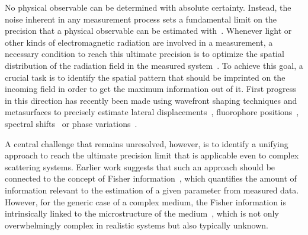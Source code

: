 \documentclass[aps,pra,twocolumn,amsmath,amssymb,superscriptaddress,10pt,nobibnotes]{revtex4-2}
\begin{document}
\maketitle

	
No physical observable can be determined with absolute certainty. 
Instead, the noise inherent in any measurement process sets a fundamental limit on the precision that a physical observable can be estimated with~\cite{kay_fundamentals_1993,giovannetti_advances_2011}. 
Whenever light or other kinds of electromagnetic radiation are involved in a measurement, a necessary condition to reach this ultimate precision is to optimize the spatial distribution of the radiation field in the measured system~\cite{barrett_foundations_2013}. To achieve this goal, a crucial task is to identify the spatial pattern that should be imprinted on the incoming field in order to get the maximum information out of it. First progress in this direction has recently been made using wavefront shaping techniques and metasurfaces to precisely estimate lateral displacements~\cite{van_putten_nonimaging_2012,yuan_detecting_2019}, fluorophore positions~\cite{shechtman_optimal_2014,balzarotti_nanometer_2017}, spectral shifts~\cite{ambichl_super-_2017} or phase variations~\cite{juffmann_local_2020}. 

A central challenge that remains unresolved, however, is to identify a unifying approach to reach the ultimate precision limit that is applicable even to complex scattering systems. Earlier work suggests that such an approach should be connected to the concept of Fisher infor\-mation~\cite{kay_fundamentals_1993,giovannetti_advances_2011,shechtman_optimal_2014,bouchet_influence_2020}, which quantifies the amount of information relevant to the estimation of a given parameter from measured data. 
However, for the generic case of a complex medium, the Fisher information is intrinsically linked to the microstructure of the medium~\cite{bouchet_influence_2020}, which is not only overwhelmingly complex in realistic systems but also typically unknown. 
\end{document}
